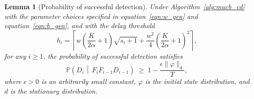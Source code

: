 \documentclass[twoside]{article}
\def\eqref#1{equation~\ref{#1}}
\theoremstyle{plain}
\newtheorem{lemma}[theorem]{Lemma}
\theoremstyle{definition}
\theoremstyle{remark}
\begin{document}
\begin{lemma}[Probability of successful detection]
    \label{applem:SD}
    Under Algorithm~\ref{alg:mucb_cd} with the parameter choices specified in \eqref{eqn:w_gen} and \eqref{eqn:b_gen}, and with the delay threshold
    \begin{equation}
        h_{i} = \left\lceil 
        w\left(\frac{K}{2\alpha}+1\right)\sqrt{s_i+1}
        +\frac{w^2}{4}\left(\frac{K}{2\alpha}+1\right)^2
        \right\rceil,
    \end{equation}
    for any $i \ge 1$, the probability of successful detection satisfies
    \begin{equation}
        \mathbb{P}\!\left(D_i \,\middle|\, \overline{F}_{i}\overline{F}_{i-1} D_{i-1}\right)
        \;\ge\; 1 - \frac{\epsilon \lVert \varphi \rVert_{d}}{T},
    \end{equation}
    where $\epsilon > 0$ is an arbitrarily small constant, $\varphi$ is the initial state distribution, and $d$ is the stationary distribution.
\end{lemma}
\end{document}
